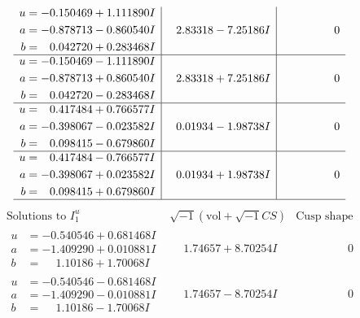 \documentclass[1p]{elsarticle_modified}
\theoremstyle{definition}
\newcommand{\I}{\sqrt{-1}}
\begin{document}
$$\begin{array}{c|c|c}
\begin{aligned}
u &= -0.150469 + 1.111890 I \\
a &= -0.878713 - 0.860540 I \\
b &= \phantom{-}0.042720 + 0.283468 I\end{aligned}
 & \phantom{-}2.83318 - 7.25186 I & \phantom{-0.000000 } 0 \\ \hline\begin{aligned}
u &= -0.150469 - 1.111890 I \\
a &= -0.878713 + 0.860540 I \\
b &= \phantom{-}0.042720 - 0.283468 I\end{aligned}
 & \phantom{-}2.83318 + 7.25186 I & \phantom{-0.000000 } 0 \\ \hline\begin{aligned}
u &= \phantom{-}0.417484 + 0.766577 I \\
a &= -0.398067 - 0.023582 I \\
b &= \phantom{-}0.098415 - 0.679860 I\end{aligned}
 & \phantom{-}0.01934 - 1.98738 I & \phantom{-0.000000 } 0 \\ \hline\begin{aligned}
u &= \phantom{-}0.417484 - 0.766577 I \\
a &= -0.398067 + 0.023582 I \\
b &= \phantom{-}0.098415 + 0.679860 I\end{aligned}
 & \phantom{-}0.01934 + 1.98738 I & \phantom{-0.000000 } 0\\
 \hline 
 \end{array}$$\newpage$$\begin{array}{c|c|c}  
\text{Solutions to }I^u_{1}& \I (\text{vol} + \sqrt{-1}CS) & \text{Cusp shape}\\
 \hline 
\begin{aligned}
u &= -0.540546 + 0.681468 I \\
a &= -1.409290 + 0.010881 I \\
b &= \phantom{-}1.10186 + 1.70068 I\end{aligned}
 & \phantom{-}1.74657 + 8.70254 I & \phantom{-0.000000 } 0 \\ \hline\begin{aligned}
u &= -0.540546 - 0.681468 I \\
a &= -1.409290 - 0.010881 I \\
b &= \phantom{-}1.10186 - 1.70068 I\end{aligned}
 & \phantom{-}1.74657 - 8.70254 I & \phantom{-0.000000 } 0 \\ \hline\begin{aligned}

\end{aligned}
\end{array}$$
\end{document}
